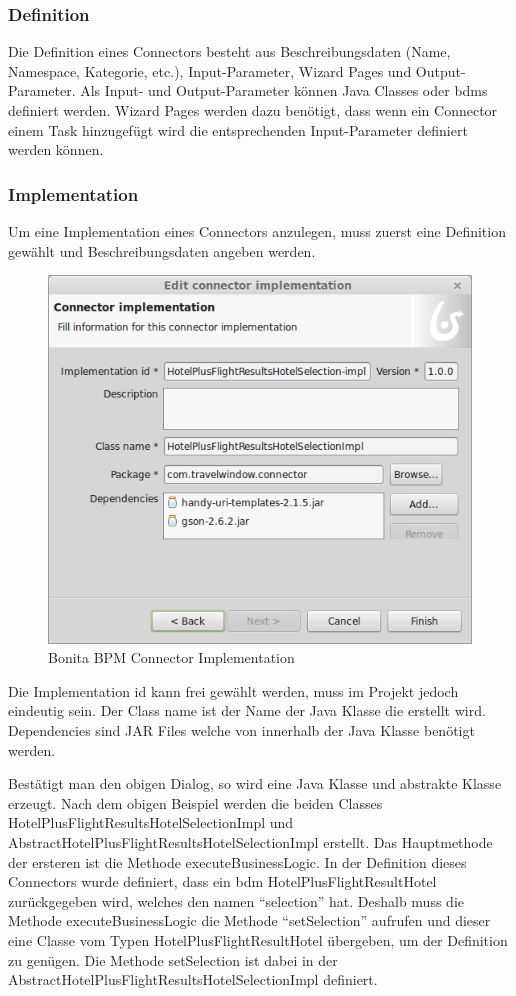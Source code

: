 \subsubsection{Definition}
Die Definition eines Connectors besteht aus Beschreibungsdaten (Name, Namespace, Kategorie, etc.), Input-Parameter, Wizard Pages und Output-Parameter. Als Input- und Output-Parameter können Java Classes oder \glspl{bdm} definiert werden. Wizard Pages werden dazu benötigt, dass wenn ein Connector einem Task hinzugefügt wird die entsprechenden Input-Parameter definiert werden können.

\subsubsection{Implementation}
Um eine Implementation eines Connectors anzulegen, muss zuerst eine Definition gewählt und Beschreibungsdaten angeben werden.
\begin{figure}[H]
	\centering
	\includegraphics[width=1\textwidth]{images/bonita-connectors-implementation.png}
	\caption{Bonita BPM Connector Implementation}
	\label{fig:analyse:bonita:connectors:implementation}
\end{figure}
Die Implementation id kann frei gewählt werden, muss im Projekt jedoch eindeutig sein. Der Class name ist der Name der Java Klasse die erstellt wird. Dependencies sind JAR Files welche von innerhalb der Java Klasse benötigt werden.

Bestätigt man den obigen Dialog, so wird eine Java Klasse und abstrakte Klasse erzeugt. Nach dem obigen Beispiel werden die beiden Classes HotelPlusFlightResultsHotelSelectionImpl und AbstractHotelPlusFlightResultsHotelSelectionImpl erstellt. Das Hauptmethode der ersteren ist die Methode executeBusinessLogic. In der Definition dieses Connectors wurde definiert, dass ein \gls{bdm} HotelPlusFlightResultHotel zurückgegeben wird, welches den namen "`selection"' hat. Deshalb muss die Methode executeBusinessLogic die Methode "`setSelection"' aufrufen und dieser eine Classe vom Typen HotelPlusFlightResultHotel übergeben, um der Definition zu genügen. 
Die Methode setSelection ist dabei in der AbstractHotelPlusFlightResultsHotelSelectionImpl definiert.

